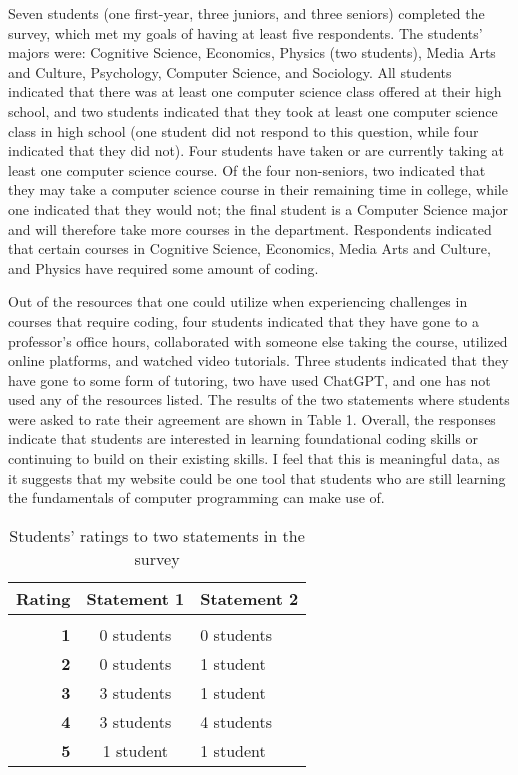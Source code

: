 \documentclass[10pt,twocolumn]{article}
\begin{document}
Seven students (one first-year, three juniors, and three seniors) completed the survey, which met my goals of having at least five respondents. The students’ majors were: Cognitive Science, Economics, Physics (two students), Media Arts and Culture, Psychology, Computer Science, and Sociology. All students indicated that there was at least one computer science class offered at their high school, and two students indicated that they took at least one computer science class in high school (one student did not respond to this question, while four indicated that they did not). Four students have taken or are currently taking at least one computer science course. Of the four non-seniors, two indicated that they may take a computer science course in their remaining time in college, while one indicated that they would not; the final student is a Computer Science major and will therefore take more courses in the department. Respondents indicated  that certain courses in Cognitive Science, Economics, Media Arts and Culture, and Physics have required some amount of coding. 

Out of the resources that one could utilize when experiencing challenges in courses that require coding, four students indicated that they have gone to a professor's office hours, collaborated with someone else taking the course, utilized online platforms, and watched video tutorials. Three students indicated that they have gone to some form of tutoring, two have used ChatGPT, and one has not used any of the resources listed. The results of the two statements where students were asked to rate their agreement are shown in Table 1. Overall, the responses indicate that students are interested in learning foundational coding skills or continuing to build on their existing skills. I feel that this is meaningful data, as it suggests that my website could be one tool that students who are still learning the fundamentals of computer programming can make use of.



\begin{table}
    \footnotesize
    \begin{tabular}{r|cl}
        \textbf{Rating} & \textbf{Statement 1} &  \textbf{Statement 2} \\
        \hline \\
        \textbf{1} &  0 students &  0 students  \\
        \textbf{2} &  0 students &  1 student   \\
        \textbf{3} &  3 students &  1 student   \\
        \textbf{4} &  3 students &  4 students  \\
        \textbf{5} &  1 student  &  1 student   \\
    \end{tabular}
    \caption{Students' ratings to two statements in the survey}
    \label{tbl:timeline}
\end{table}
\end{document}
